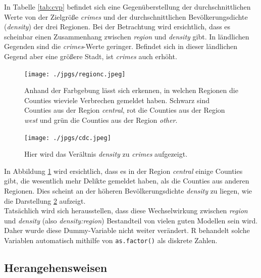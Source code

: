 In Tabelle \ref{tab:cvp} befindet sich eine Gegen\"uberstellung der durchschnittlichen Werte von der Zielgr\"o\ss{}e \textit{crimes} und der durchschnittlichen Bev\"olkerungsdichte (\textit{density}) der drei Regionen.
Bei der Betrachtung wird ersichtlich, dass es scheinbar einen Zusammenhang zwischen \textit{region} und \textit{density} gibt.
In l\"andlichen Gegenden sind die \textit{crimes}-Werte geringer.
Befindet sich in dieser l\"andlichen Gegend aber eine gr\"o\ss{}ere Stadt, ist \textit{crimes} auch erh\"oht.

\begin{figure}
\centering
\texttt{[image: ./jpgs/regionc.jpeg]}
 \abovecaptionskip
\caption[Regionen Vergleich Verbrechen]{Anhand der Farbgebung l\"asst sich erkennen, in welchen Regionen die Counties wieviele Verbrechen gemeldet haben. Schwarz sind Counties aus der Region \textit{central}, rot die Counties aus der Region \textit{west} und gr\"un die Counties aus der Region \textit{other}.}
\label{fig:rc}
\end{figure}

\begin{figure}
\centering
\texttt{[image: ./jpgs/cdc.jpeg]}
 \abovecaptionskip
\caption[Ver\"altnis \textit{density} zu \textit{crimes}]{Hier wird das Ver\"altnis \textit{density} zu \textit{crimes} aufgezeigt.}
\label{fig:cdc}
\end{figure}


In Abbildung \ref{fig:rc} wird ersichtlich, dass es in der Region \textit{central} einige Counties gibt, die wesentlich mehr Delikte gemeldet haben, als die Counties aus anderen Regionen.
Dies scheint an der h\"oheren Bev\"olkerungsdichte \textit{density} zu liegen, wie die Darstellung \ref{fig:cdc} aufzeigt. \\
Tats\"achlich wird sich herausstellen, dass diese Wechselwirkung zwischen \textit{region} und \textit{density} (also \textit{density:region}) Bestandteil von vielen guten Modellen sein wird.
Daher wurde diese Dummy-Variable nicht weiter ver\"andert.
\textsf{R} behandelt solche Variablen automatisch mithilfe von \texttt{as.factor()} als diskrete Zahlen.


\subsection{Herangehensweisen}
